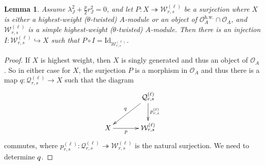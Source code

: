 \documentclass[11pt, reqno]{amsart}
\newtheorem{lem}[thm]{Lemma}
\theoremstyle{definition}\newtheorem{defi}[thm]{Definition}
\theoremstyle{definition}\newtheorem{rem}[thm]{Remark}
\theoremstyle{definition}\newtheorem{exam}[thm]{Example}
\theoremstyle{definition}\newtheorem{assum}[thm]{Assumption}
\newcommand{\cO}{\mathcal{O}}
\newcommand{\cW}{\mathcal{W}}
\newcommand{\cQ}{\mathcal{Q}}
\newcommand{\Id}{\mathrm{Id}}
\let\ker\relax
\DeclareMathOperator{\ker}{Ker}
\begin{document}
\begin{lem}\label{lem:simple_proj_in_hw_category}
Assume $\lambda_J^2+\frac{p}{2}r_J^2=0$, and let $P: X\twoheadrightarrow\cW_{r,s}^{(\ell)}$ be a surjection where $X$ is either a highest-weight ($\theta$-twisted) $A$-module or an object of $\cO_A^{\mathrm{h.w.}}\cap\cO_A$, and $\cW_{r,s}^{(\ell)}$ is a simple highest-weight ($\theta$-twisted) $A$-module. Then there is an injection $I: \cW_{r,s}^{(\ell)}\hookrightarrow X$ such that $P\circ I=\Id_{\cW_{r,s}^{(\ell)}}$.
\end{lem}
\begin{proof}
 If $X$ is highest weight, then $X$ is singly generated and thus an object of $\cO_A$. So in either case for $X$, the surjection $P$ is a morphism in $\cO_A$ and thus there is a map $q: \cQ_{r,s}^{(\ell)}\rightarrow X$ such that the diagram
\begin{equation*}
\xymatrixcolsep{3pc}
\xymatrix{
& \cQ_{r,s}^{(\ell)} \ar[ld]_q \ar[d]^(.45){p^{(\ell)}_{r,s}} \\
X \ar[r]_(.45){p} & \cW_{r,s}^{(\ell)}
}
\end{equation*}
commutes, where $p^{(\ell)}_{r,s}: \cQ_{r,s}^{(\ell)}\twoheadrightarrow\cW_{r,s}^{(\ell)}$ is the natural surjection. We need to determine $\ker q$.


\end{proof}
\end{document}
